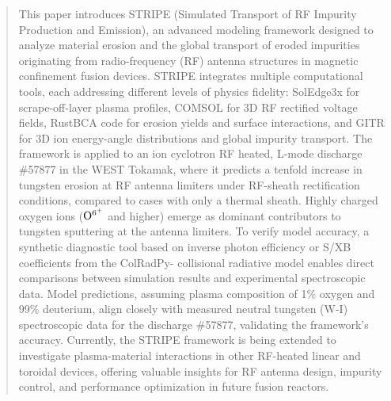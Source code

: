 \documentclass[10pt]{iopart}
\begin{document}
\begin{abstract}

This paper introduces STRIPE (Simulated Transport of RF Impurity Production and Emission), an advanced modeling framework designed to analyze material erosion and the global transport of eroded impurities originating from radio-frequency (RF) antenna structures in magnetic confinement fusion devices. STRIPE integrates multiple computational tools, each addressing different levels of physics fidelity: SolEdge3x for scrape-off-layer plasma profiles, COMSOL for 3D RF rectified voltage fields, RustBCA code for erosion yields and surface interactions, and GITR for 3D ion energy-angle distributions and global impurity transport.  The framework is applied to an ion cyclotron RF heated, L-mode discharge  \#57877 in the WEST Tokamak, where it predicts a tenfold increase in tungsten erosion at RF antenna limiters under RF-sheath rectification conditions, compared to cases with only a thermal sheath. Highly charged oxygen ions ($\rm O^{6^+}$ and higher) emerge as dominant contributors to tungsten sputtering at the antenna limiters. To verify model accuracy, a synthetic diagnostic tool based on inverse photon efficiency or \rm S/XB coefficients from the ColRadPy- collisional radiative model enables direct comparisons between simulation results and experimental spectroscopic data. Model  predictions, assuming plasma composition of 1\% oxygen and 99\% deuterium,  align closely with measured neutral tungsten (W-I) spectroscopic data for the discharge  \#57877, validating the framework's accuracy. Currently, the STRIPE framework is being extended to investigate plasma-material interactions in other RF-heated linear and toroidal devices, offering valuable insights for RF antenna design, impurity control, and performance optimization in future fusion reactors.


\end{abstract}
%
%
%
% 
\ioptwocol
%
\end{document}
